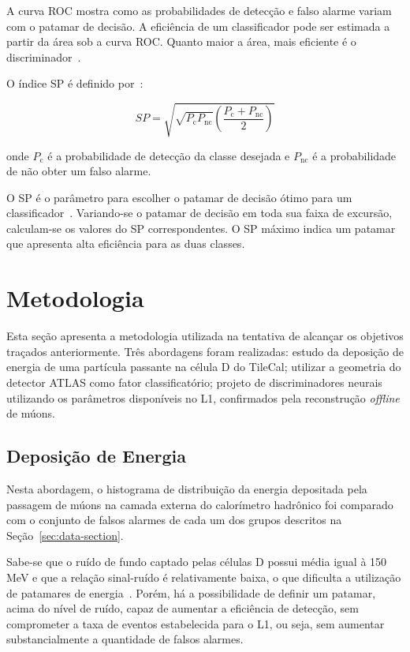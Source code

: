 A curva ROC mostra como as probabilidades de detecção e falso alarme variam com
o patamar de decisão. A eficiência de um classificador pode ser estimada a
partir da área sob a curva ROC. Quanto maior a área, mais eficiente é o
discriminador~\cite{ref:SIMAS}.

O índice SP é definido por~\cite{CIODARO2012}:

\begin{equation}
SP = \sqrt{\sqrt{P_{\text{c}}P_{\text{nc}}} \left(\frac{P_{\text{c}} +
P_{\text{nc}}}{2}\right)}
\end{equation}

onde $P_\text{c}$ é a probabilidade de detecção da classe desejada e
$P_{\text{nc}}$ é a probabilidade de não obter um falso alarme.

O SP é  o parâmetro para escolher o patamar de decisão ótimo para um
classificador~\cite{ref:SIMAS}. Variando-se o patamar de decisão em toda sua
faixa de excursão, calculam-se os valores do SP correspondentes. O SP máximo
indica um patamar que apresenta alta eficiência para as duas classes.

\section{Metodologia}

Esta seção apresenta a metodologia utilizada na tentativa de alcançar os
objetivos traçados anteriormente. Três abordagens foram realizadas: estudo da
deposição de energia de uma partícula passante na célula D do TileCal; utilizar
a geometria do detector ATLAS como fator classificatório; projeto de
discriminadores neurais utilizando os parâmetros disponíveis no L1, confirmados
pela reconstrução \emph{offline} de múons.

\subsection*{Deposição de Energia}

Nesta abordagem, o histograma de distribuição da energia depositada pela
passagem de múons na camada externa do calorímetro hadrônico foi comparado com o
conjunto de falsos alarmes de cada um dos grupos descritos na
Seção~\ref{sec:data-section}.

Sabe-se que o ruído de fundo captado pelas células D possui média igual à 150
MeV e que a relação sinal-ruído é relativamente baixa, o que dificulta a
utilização de patamares de energia~\cite{CIODARO2009}. Porém, há a possibilidade
de definir um patamar, acima do nível de ruído, capaz de aumentar a eficiência
de detecção, sem comprometer a taxa de eventos estabelecida para o L1, ou seja,
sem aumentar substancialmente a quantidade de falsos alarmes.

